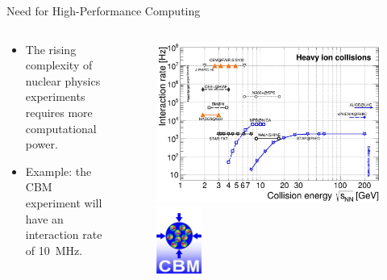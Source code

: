 \begin{frame}{Need for High-Performance Computing}
    \begin{columns}
        \begin{column}{0.5\textwidth}
            \begin{itemize}
                \item The rising complexity of nuclear physics experiments requires more computational power.
                \item Example: the CBM experiment will have an interaction rate of \SI{10}{\mega\hertz}.
            \end{itemize}
        \end{column}
        \begin{column}{0.5\textwidth}
            \begin{figure}
                \centering
                \includegraphics[width=\textwidth]{images/galatyuk_map_of_experiments.png}
                \includegraphics[width=0.2\textwidth]{images/cbm_logo.png}
            \end{figure}
        \end{column}
    \end{columns}
\end{frame}


